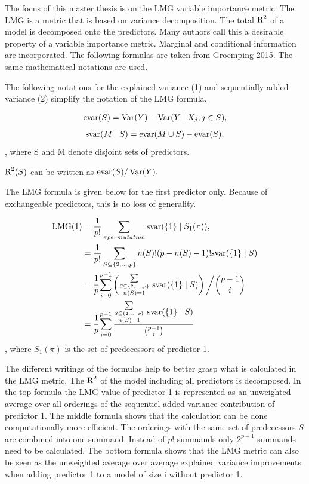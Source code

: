 \documentclass[11pt,a4paper,twoside]{book}\usepackage[]{graphicx}\usepackage[]{color}
\begin{document}
The focus of this master thesis is on the LMG variable importance metric. The LMG is a metric that is based on variance decomposition. The total $\text{R}^2$ of a model is decomposed onto the predictors. Many authors call this a desirable property of a variable importance metric. Marginal and conditional information are incorporated.  The following formulas are taken from Groemping 2015. The same mathematical notations are used. 

The following  notations for the explained variance (1) and sequentially added variance (2) simplify the notation of the LMG formula. 

   \begin{align} 
     \text{evar}(S) = \operatorname{Var}(Y) - \operatorname{Var}( Y \mid X_{j}, j \in S),   \label{eq:1} 
   \end{align} 
   \begin{align} 
     \text{svar}(M \mid S) = \text{evar}(M \cup S) - \text{evar}(S), \label{eq:2} 
    \end{align} , where S and M denote disjoint sets of predictors.
    
 $\text{R}^2(S)$ can be written as $\text{evar}(S)/\operatorname{Var}(Y).$   
   
  The LMG formula is given below for the first predictor only. Because of exchangeable predictors, this is no loss of generality.

   \begin{align} 
     \LMG(1) &= \frac{1}{p!} \sum_{\pi permutation}^{} \SVAR(\{1\} \mid S_{1}(\pi)),   \nonumber  \\
     &= \frac{1}{p!} \sum_{S \subseteq \{ 2, \dots, p \} }^{} n(S)!(p-n(S)-1)! \SVAR(\{1\} \mid S) \nonumber  \\
     &=  \cfrac{1}{p} \sum_{i=0}^{p-1} \left( \substack {\sum\limits_{ S \subseteq \{ 2, \dots, p \}}\\n(S)=1}^{} \ \SVAR(\{1\} \mid S)\right)\bigg/ \binom{p-1}{i}\\   
         &=  \cfrac{1}{p} \sum_{i=0}^{p-1} \frac{ \substack{\sum\limits_{ S \subseteq \{ 2, \dots, p \}}\\n(S)=1}^{} \ \SVAR(\{1\} \mid S)}{\binom{p-1}{i}} \\      
   \end{align},
   where $S_{1}(\pi)$ is the set of predecessors of predictor 1.
   
   The different writings of the formulas help to better grasp what is calculated in the LMG metric. The $\text{R}^2$ of the model including all predictors is decomposed. In the top formula the LMG value of predictor 1 is represented as an unweighted average over all orderings of the sequentiel added variance contribution of predictor 1. The middle formula shows that the calculation can be  done computationally more efficient. The orderings with the same set of predecessors $S$ are combined into one summand. Instead of $p!$ summands only $2^{p-1}$ summands need to be calculated. The bottom formula shows that the LMG metric can also be seen as the unweighted average over average explained variance improvements when adding predictor 1 to a model of size i without predictor 1. 
   
\end{document}
